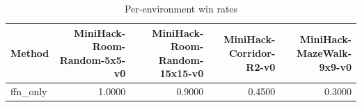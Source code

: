 \begin{table}[htbp]
\centering
\caption{Per-environment win rates}
\label{tab:per-env}
\begin{tabular}{lrrrr}
\toprule
\textbf{Method} & \textbf{MiniHack-Room-Random-5x5-v0} & \textbf{MiniHack-Room-Random-15x15-v0} & \textbf{MiniHack-Corridor-R2-v0} & \textbf{MiniHack-MazeWalk-9x9-v0} \\
\midrule
ffn\_only & 1.0000 & 0.9000 & 0.4500 & 0.3000 \\
\bottomrule
\end{tabular}
\end{table}